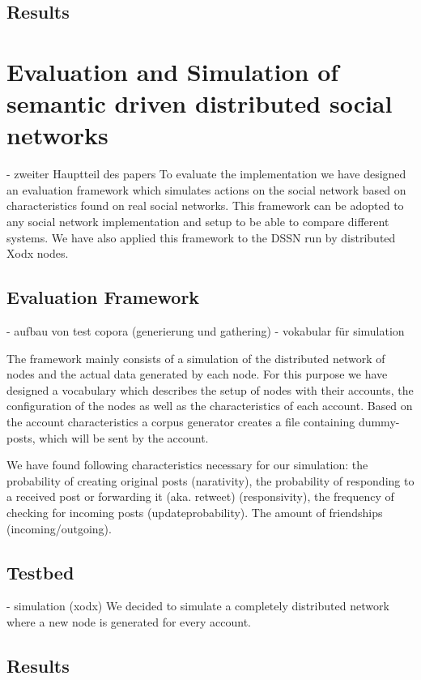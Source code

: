 \documentclass{llncs}
\begin{document}
\subsection{Results}


\section{Evaluation and Simulation of semantic driven distributed social networks}

- zweiter Hauptteil des papers
To evaluate the implementation we have designed an evaluation framework which simulates actions on the social network based on characteristics found on real social networks.
This framework can be adopted to any social network implementation and setup to be able to compare different systems.
We have also applied this framework to the DSSN run by distributed Xodx nodes.


\subsection{Evaluation Framework}
- aufbau von test copora (generierung und gathering)
- vokabular für simulation

The framework mainly consists of a simulation of the distributed network of nodes and the actual data generated by each node.
For this purpose we have designed a vocabulary which describes the setup of nodes with their accounts, the configuration of the nodes as well as the characteristics of each account.
Based on the account characteristics a corpus generator creates a file containing dummy-posts, which will be sent by the account.


We have found following characteristics necessary for our simulation:
the probability of creating original posts (narativity), the probability of responding to a received post or forwarding it (aka. retweet) (responsivity), the frequency of checking for incoming posts (updateprobability).
The amount of friendships (incoming/outgoing).

\subsection{Testbed}
- simulation (xodx)
We decided to simulate a completely distributed network where a new node is generated for every account.

\subsection{Results}
\end{document}
